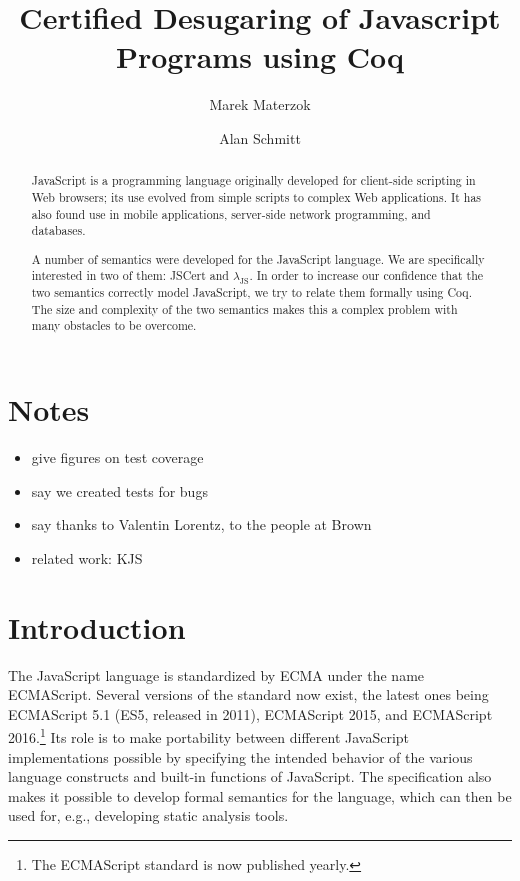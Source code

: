 \documentclass{llncs}
\begin{document}
\title{Certified Desugaring of Javascript Programs using Coq}

\author{Marek Materzok \and Alan Schmitt}

\maketitle

\newcommand{\lambdajs}{$\lambda_\textrm{JS}$\xspace}

\begin{abstract}
JavaScript is a programming language originally developed for client-side
scripting in Web browsers; its use evolved from simple scripts to
complex Web applications. It has also found use in mobile applications,
server-side network programming, and databases.

A number of semantics were developed for the JavaScript language.
We are specifically interested in two of them: JSCert and \lambdajs.
In order to increase our confidence that the two semantics correctly
model JavaScript, we try to relate them formally using Coq. The size and complexity
of the two semantics makes this a complex problem with many obstacles
to be overcome.
\end{abstract}

\section{Notes}

\begin{itemize}
\item give figures on test coverage
\item say we created tests for bugs
\item say thanks to Valentin Lorentz, to the people at Brown
\item related work: KJS
\end{itemize}

\section{Introduction}

The JavaScript language is standardized by ECMA under the name
ECMAScript. Several versions of the standard now exist, the latest
ones being ECMAScript 5.1 (ES5, released in 2011), ECMAScript 2015, and
ECMAScript 2016.\footnote{The ECMAScript standard is now published yearly.} Its role is to make portability between different
JavaScript implementations possible by specifying the intended behavior
of the various language constructs and built-in functions of JavaScript.
The specification also makes it possible to develop formal semantics
for the language, which can then be used for, e.g., developing
static analysis tools.
\end{document}
